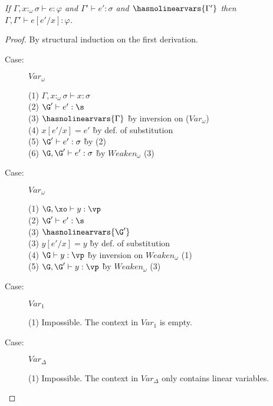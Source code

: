 

\begin{lemma}
\emph{If $\Gamma, x{:}_\omega\sigma \vdash e : \varphi$ and $\Gamma' \vdash e' : \sigma$ and $\hasnolinearvars{\Gamma'}$ then $\Gamma,\Gamma' \vdash e[e'/x] : \varphi$.}
\end{lemma}

\begin{proof}
By structural induction on the first derivation.

\begin{description}

\item[Case:] $Var_\omega$
\begin{tabbing}
  (1) $\Gamma, x{:}_\omega\sigma \vdash x : \sigma$\\
  (2) $\G' \vdash e' : \s$\\
  (3) $\hasnolinearvars{\Gamma}$ \` by inversion on ($Var_\omega$)\\
  (4) $x[e'/x] = e'$ \` by def. of substitution\\
  (5) $\G' \vdash e' : \sigma$ \` by (2)\\
  (6) $\G, \G' \vdash e' : \sigma$ \` by $Weaken_\omega$ (3)\\
\end{tabbing}

\item[Case:] $Var_\omega$
\begin{tabbing}
  (1) $\G, \xo \vdash y : \vp$\\
  (2) $\G' \vdash e' : \s$\\
  (3) $\hasnolinearvars{\G'}$\\
  (3) $y[e'/x] = y$ \` by def. of substitution\\
  (4) $\G \vdash y : \vp$ \` by inversion on $Weaken_\omega$ (1)\\
  (5) $\G, \G' \vdash y : \vp$ \` by $Weaken_\omega$ (3)\\
\end{tabbing}

\item[Case:] $Var_1$
\begin{tabbing}
  (1) Impossible. The context in $Var_1$ is empty.
\end{tabbing}

\item[Case:] $Var_\Delta$
\begin{tabbing}
  (1) Impossible. The context in $Var_\Delta$ only contains linear variables.
\end{tabbing}


\end{description}
\end{proof}
